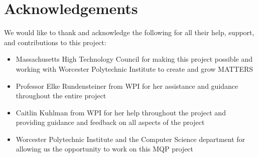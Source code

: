 \chapter*{Acknowledgements}
	
We would like to thank and acknowledge the following for all their help, support, and contributions to this project:
\begin{itemize}
	\item Massachusetts High Technology Council for making this project possible and working with Worcester Polytechnic Institute to create and grow MATTERS
	
	\item Professor Elke Rundensteiner from WPI for her assistance and guidance throughout the entire project
	
	\item Caitlin Kuhlman from WPI for her help throughout the project and providing guidance and feedback on all aspects of the project
	
	\item Worcester Polytechnic Institute and the Computer Science department for allowing us the opportunity to work on this MQP project 
\end{itemize}